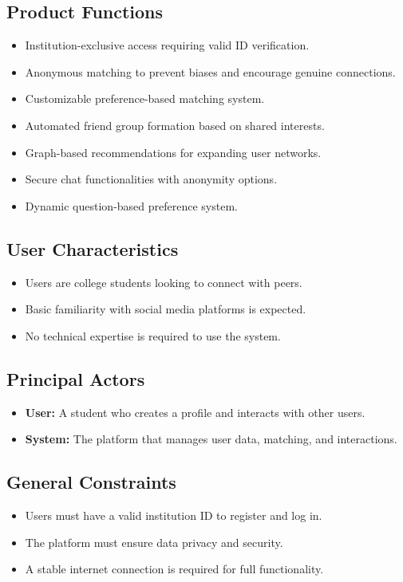 \documentclass{article}
\begin{document}
\subsection{Product Functions}
\begin{itemize}
    \item Institution-exclusive access requiring valid ID verification.
    \item Anonymous matching to prevent biases and encourage genuine connections.
    \item Customizable preference-based matching system.
    \item Automated friend group formation based on shared interests.
    \item Graph-based recommendations for expanding user networks.
    \item Secure chat functionalities with anonymity options.
    \item Dynamic question-based preference system.
\end{itemize}

\subsection{User Characteristics}
\begin{itemize}
    \item Users are college students looking to connect with peers.
    \item Basic familiarity with social media platforms is expected.
    \item No technical expertise is required to use the system.
\end{itemize}

\subsection{Principal Actors}
\begin{itemize}
    \item \textbf{User:} A student who creates a profile and interacts with other users.
    \item \textbf{System:} The platform that manages user data, matching, and interactions.
\end{itemize}

\subsection{General Constraints}
\begin{itemize}
    \item Users must have a valid institution ID to register and log in.
    \item The platform must ensure data privacy and security.
    \item A stable internet connection is required for full functionality.
\end{itemize}
\end{document}
